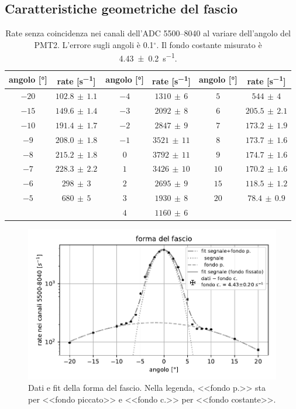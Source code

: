 \subsection{Caratteristiche geometriche del fascio}

\begin{table}
	\centering

	\begin{tabular}{cc|cc|cc}
		angolo [\si{\degree}] & rate [\si{s^{-1}}] & angolo [\si{\degree}] & rate [\si{s^{-1}}] & angolo [\si{\degree}] & rate [\si{s^{-1}}] \\
		\hline
			$-20$ & $102.8\,\pm\,1.1$ & $-4$ & $1310\,\pm\,6$  & $5$ & $544\,\pm\,4$       \\
			$-15$ & $149.6\,\pm\,1.4$ & $-3$ & $2092\,\pm\,8$  & $6$ & $205.5\,\pm\,2.1$   \\
			$-10$ & $191.4\,\pm\,1.7$ & $-2$ & $2847\,\pm\,9$  & $7$ & $173.2\,\pm\,1.9$   \\
			$-9$ & $208.0\,\pm\,1.8$  & $-1$ & $3521\,\pm\,11$ & $8$ & $173.7\,\pm\,1.6$   \\
			$-8$ & $215.2\,\pm\,1.8$  & $0$ & $3792\,\pm\,11$  & $9$ & $174.7\,\pm\,1.6$   \\
			$-7$ & $228.3\,\pm\,2.2$  & $1$ & $3426\,\pm\,10$  & $10$ & $170.2\,\pm\,1.6$  \\
			$-6$ & $298\,\pm\,3$      & $2$ & $2695\,\pm\,9$   & $15$ & $118.5\,\pm\,1.2$  \\
			$-5$ & $680\,\pm\,5$      & $3$ & $1930\,\pm\,8$   & $20$ & $78.4\,\pm\,0.9$   \\
			     &                  & $4$ & $1160\,\pm\,6$   &      &
	\end{tabular}

	\caption{Rate senza coincidenza nei canali dell'ADC 5500--8040
	al variare dell'angolo del PMT2.
	L'errore sugli angoli è 0.1$^{\circ}$.
	Il fondo costante misurato è \SI{4.43\pm0.2}{s^{-1}}.}
	\label{tabfo}
\end{table}

\begin{figure}
	\centering
	\includegraphics[width=32em]{forma}
	\caption{Dati e fit della forma del fascio.
	Nella legenda, <<fondo p.>> sta per <<fondo piccato>> e <<fondo c.>> per <<fondo costante>>.}
	\label{forma}
\end{figure}


